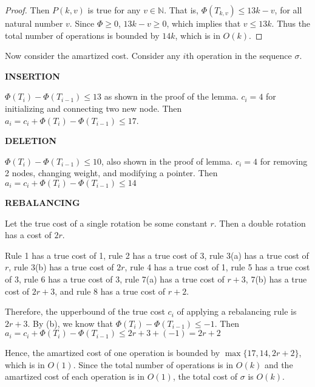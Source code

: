 \documentclass[10pt]{article}
\begin{document}
\begin{enumerate}
\begin{enumerate}
\begin{proof}
					Then $P(k, v)$ is true for any $v \in \mathbb{N}$.
					That is, $\Phi(T_{k,v}) \leq 13k-v$, for all natural number
					$v$.
					Since $\Phi \geq 0$, $13k-v \geq 0$, which implies that $v
					\leq 13k$. 
					Thus the total number of operations is bounded by $14k$, which
					is in $O(k)$. 
				\end{proof}

				Now consider the amartized cost.
				Consider any $i$th operation in the sequence $\sigma$.

				\textbf{INSERTION}
				\begin{addmargin}[1em]{0em}
					$\Phi(T_i) - \Phi(T_{i-1}) \leq 13$ as shown in the proof
					of the lemma.
					$c_i = 4$ for initializing and connecting two new node. 
					Then $a_i = c_i + \Phi(T_i) - \Phi(T_{i-1}) \leq 17$.
				\end{addmargin}

				\textbf{DELETION}
				\begin{addmargin}[1em]{0em}
					$\Phi(T_i) - \Phi(T_{i-1}) \leq 10$, also shown in the
					proof of lemma.
					$c_i = 4$ for removing 2 nodes, changing weight, and
					modifying a pointer.
					Then $a_i = c_i + \Phi(T_i) - \Phi(T_{i-1}) \leq 14$
				\end{addmargin}

				\textbf{REBALANCING}
				\begin{addmargin}[1em]{0em}
					Let the true cost of a single rotation be some constant $r$.
					Then a double rotation has a cost of $2r$.

					Rule 1 has a true cost of 1, rule 2 has a true cost
					of 3, rule 3(a) has a true cost of $r$, rule 3(b) has a
					true cost of $2r$, 	rule 4 has a true cost of 1, rule 5 has
					a true cost of 3, rule 6 has a true cost of 3, rule 7(a)
					has a true cost of $r+3$, 7(b) has a true cost of $2r+3$, 
					and rule 8 has a true cost of $r+2$.

					Therefore, the upperbound of the true cost $c_i$ of
					applying a rebalancing rule is $2r+3$. 
					By (b), we know that $\Phi(T_i) - \Phi(T_{i-1}) \leq -1$.
					Then $a_i = c_i + \Phi(T_i) - \Phi(T_{i-1}) \leq 2r+3 + (-1) = 2r+2$
				\end{addmargin}

				Hence, the amartized cost of one operation is bounded by
				$\max\{17, 14, 2r+2\}$, which is in $O(1)$.
				Since the total number of operations is in $O(k)$ and the
				amartized cost of each operation is in $O(1)$, the total cost
				of $\sigma$ is $O(k)$. 
		\end{enumerate}
\end{enumerate}
\end{document}
